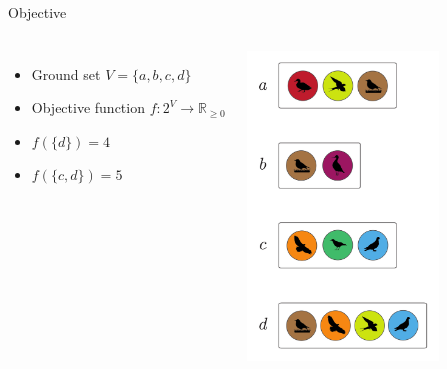 \documentclass[xetex,10pt,mathserif]{beamer}
\begin{document}
\begin{frame}{Objective}
\begin{columns}[c]
\begin{itemize}
\item<2-> Ground set $V = \{a, b, c, d\}$
\vspace{2em}
\item<3-> Objective function $f : 2^V \to \mathbb{R}_{\geq 0}$
\vspace{2em}
\item<4-> $f(\{d\}) = 4$
\vspace{2em}
\item<5-> $f(\{c, d\}) = 5$
\end{itemize}
\centering
\includegraphics[width=2in]{figures/sets.pdf}
\end{columns}
\end{frame}
\end{document}
